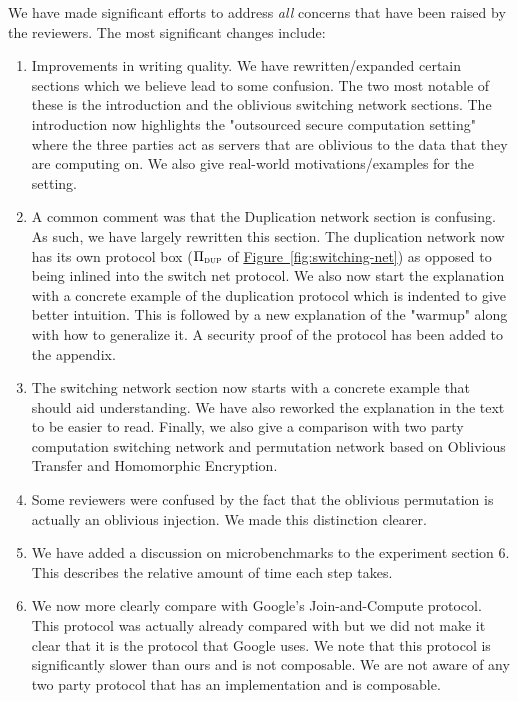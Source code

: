 \documentclass[11pt,letterpaper]{article}
\newcommand{\namedref}[2]{\hyperref[#2]{#1~\ref*{#2}}}
\newcommand{\figureref}[1]{\namedref{Figure}{#1}}
\newcommand{\proto}[1]{\ensuremath{\Pi_{\textsc{#1}}}}
\begin{document}
\color{blue}We have made significant efforts to address \emph{all} concerns that have been raised by the reviewers. The most significant changes include:
\begin{enumerate}
	\item Improvements in writing quality. We have rewritten/expanded certain sections which we believe lead to some confusion. The two most notable of these is the introduction and the oblivious switching network sections. The introduction now highlights the "outsourced secure computation setting" where the three parties act as servers that are oblivious to the data that they are computing on. We also give real-world motivations/examples for the setting. 
	
	\item A common comment was that the Duplication network section is confusing. As such, we have largely rewritten this section. The duplication network now has its own protocol box ($\proto{dup}$ of \figureref{fig:switching-net}) as opposed to being inlined into the switch net protocol. We also now start the explanation with a concrete example of the duplication protocol which is indented to give better intuition. This is followed by a new explanation of the "warmup" along with how to generalize it. A security proof of the protocol has been added to the appendix. 
	
	\item The switching network section now starts with a concrete example that should aid understanding. We have also reworked the explanation in the text to be easier to read. Finally, we also give a comparison with two party computation switching network and permutation network based on Oblivious Transfer and Homomorphic Encryption.
	
	\item Some reviewers were confused by the fact that the oblivious permutation is actually an oblivious injection. We made this distinction clearer.
	
	\item We have added a discussion on microbenchmarks to the experiment section 6. This describes the relative amount of time each step takes. 
	
	
	\item We now more clearly compare with Google's Join-and-Compute protocol. This protocol was actually already compared with but we did not make it clear that it is the protocol that Google uses. We note that this protocol is significantly slower than ours and is not composable. We are not aware of any two party protocol that has an implementation and is composable.
	

\end{enumerate}
\end{document}
